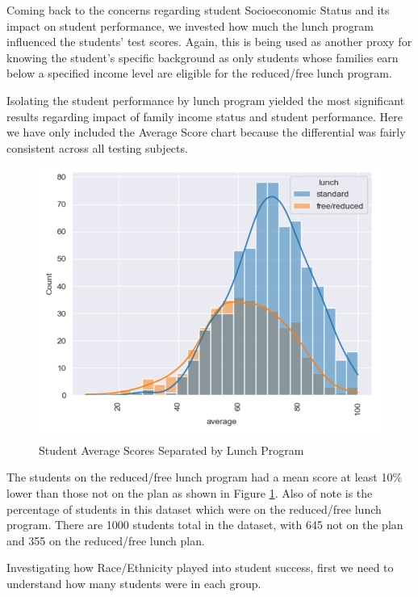 \documentclass[doc]{apa6} %
\begin{document}
Coming back to the concerns regarding student Socioeconomic Status and its impact on student performance, we invested how much the lunch program influenced the students' test scores.  Again, this is being used as another proxy for knowing the student's specific background as only students whose families earn below a specified income level are eligible for the reduced/free lunch program.

Isolating the student performance by lunch program yielded the most significant results regarding impact of family income status and student performance. Here we have only included the Average Score chart because the differential was fairly consistent across all testing subjects.

\begin{figure}[H]
    \centering
    \includegraphics[width=0.75\linewidth]{StudentAvgScoresVSReducedLunch.png}
    \caption{Student Average Scores Separated by Lunch Program}
    \label{fig:lunch1}
\end{figure}
The students on the reduced/free lunch program had a mean score at least 10\% lower than those not on the plan as shown in Figure \ref{fig:lunch1}. Also of note is the percentage of students in this dataset which were on the reduced/free lunch program. There are 1000 students total in the dataset, with 645 not on the plan and 355 on the reduced/free lunch plan. 

Investigating how Race/Ethnicity played into student success, first we need to understand how many students were in each group.
\end{document}
